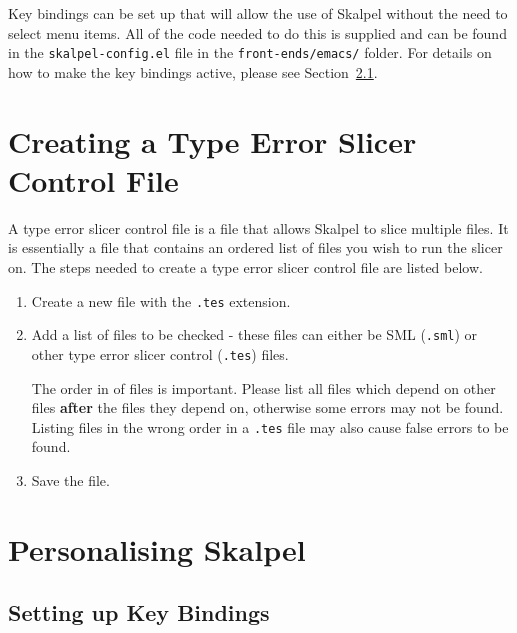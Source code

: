 \documentclass{report}
\begin{document}
Key bindings can be set up that will allow the use of Skalpel without
the need to select menu items.  All of the code needed to do this is
supplied and can be found in the \texttt{skalpel-config.el} file in
the \texttt{front-ends/emacs/} folder.  For details on how to make the key
bindings active, please see Section~\ref{sec:setting-key-bindings}.


\section{Creating a Type Error Slicer Control File}
\label{sec:skalpel-control-files}

A type error slicer control file is a file that allows Skalpel to
slice multiple files. It is essentially a file that contains an
ordered list of files you wish to run the slicer on. The steps needed
to create a type error slicer control file are listed below.

\begin{enumerate}
\item Create a new file with the \texttt{.tes} extension.
\item Add a list of files to be checked - these files can either be
  SML (\texttt{.sml}) or other type error slicer control
  (\texttt{.tes}) files.

  The order in of files is important.  Please list all files which
  depend on other files \textbf{after} the files they depend on,
  otherwise some errors may not be found.  Listing files in the wrong
  order in a \texttt{.tes} file may also cause false errors to be
  found.

\item Save the file.
\end{enumerate}

\newpage


\section{Personalising Skalpel}


\subsection{Setting up Key Bindings}
\label{sec:setting-key-bindings}
\end{document}
